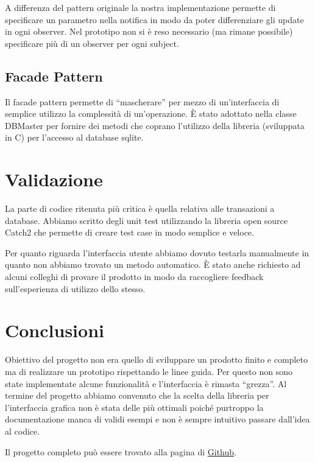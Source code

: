 \documentclass[a4paper, 11pt]{article}
\begin{document}
A differenza del pattern originale la nostra implementazione permette di specificare un parametro nella notifica in modo da poter differenziare gli update in ogni observer.
Nel prototipo non si è reso necessario (ma rimane possibile) specificare più di un observer per ogni subject. 

\subsection{Facade Pattern}
Il facade pattern permette di ``mascherare'' per mezzo di un'interfaccia di semplice utilizzo la complessità di un'operazione. È stato adottato nella classe DBMaster per fornire dei metodi che coprano l'utilizzo della libreria (sviluppata in C) per l'accesso al database sqlite.

\section{Validazione}
La parte di codice ritenuta più critica è quella relativa alle transazioni a database. Abbiamo scritto degli unit test utilizzando la libreria open source Catch2 che permette di creare test case in modo semplice e veloce. 

Per quanto riguarda l'interfaccia utente abbiamo dovuto testarla manualmente in quanto non abbiamo trovato un metodo automatico. È stato anche richiesto ad alcuni colleghi di provare il prodotto in modo da raccogliere feedback sull'esperienza di utilizzo dello stesso.

\section{Conclusioni}
Obiettivo del progetto non era quello di sviluppare un prodotto finito e completo ma di realizzare un prototipo rispettando le linee guida. Per questo non sono state implementate alcune funzionalità e l'interfaccia è rimasta ``grezza''. 
Al termine del progetto abbiamo convenuto che la scelta della libreria per l'interfaccia grafica non è stata delle più ottimali poiché purtroppo la documentazione manca di validi esempi e non è sempre intuitivo passare dall'idea al codice.

Il progetto completo può essere trovato alla pagina di \href{https://github.com/mirkomorati/elaborato_ING_SW}{Github}.
\end{document}
